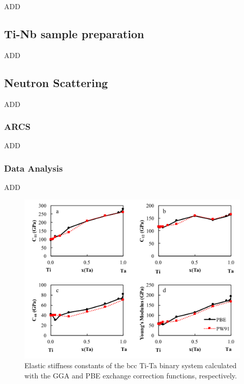 ADD

\subsection{Ti-Nb sample preparation}

ADD

\subsection{Neutron Scattering}

ADD

\subsubsection{ARCS}

ADD

\subsubsection{Data Analysis}

ADD

\pagebreak
\begin{figure}[H]
	\centering
	\includegraphics[width=\textwidth]{Chapter-2/Figures/PBEvsPW91.png}
	\caption{Elastic stiffness constants of the bcc Ti-Ta binary system calculated with the GGA and PBE exchange correction functions, respectively.}
	\label{Ch2-figure:PBEvsPW91}
\end{figure}
